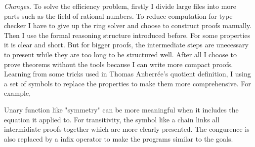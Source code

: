\documentclass{article}
\newcommand{\Conid}[1]{\mathit{#1}}
\newcommand{\Varid}[1]{\mathit{#1}}
\def\resethooks{%
  \global\let\SaveRestoreHook\empty
  \global\let\ColumnHook\empty}
\newlength{\blanklineskip}
\newcommand{\hsindent}[1]{\quad}%
\let\hspre\empty
\let\hspost\empty
\renewcommand\Varid[1]{\mathord{\textsf{#1}}}
\let\Conid\Varid
\theoremstyle{definition}
\begin{document}
\textit{Changes.} To solve the efficiency problem, firstly I divide large files into more parts such as the field of rational numbers. To reduce computation for type checker I have to give up the ring solver and choose to construct proofs manually. Then I use the formal reasoning structure introduced before. For some properties it is clear and short. But for bigger proofs, the intermediate steps are unecessary to present while they are too long to be structured well. After all I choose to prove theorems without the tools because I can write more compact proofs. Learning from some tricks used in Thomas Anberrée's quotient definition, I using a set of symbols to replace the properties to make them more comprehensive. For example,

\resethooks

Unary function like "symmetry" can be more meaningful when it includes the equation it applied to. For transitivity, the symbol like a chain links all intermidiate proofs together which are more clearly presented. The congurence is also replaced by a infix operator to make the programs similar to the goals.
\end{document}
